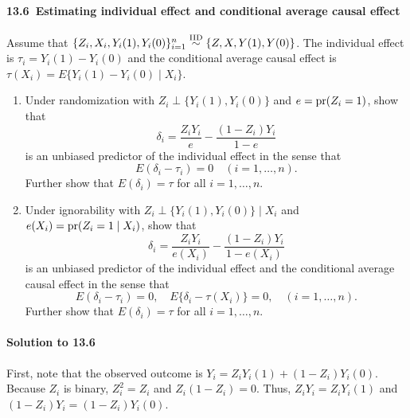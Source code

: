 \documentclass[krantz1]{krantz}
\def\iidsim{\stackrel{\textup{IID}}{\sim}}
\def\pr{\textup{pr}}
\def\ind{\perp}
\def\Paragraph{\paragraph}
\begin{document}
 \Paragraph{13.6~Estimating individual effect and conditional average causal effect}\label{hw::individual-effect-prediction}

Assume that $\{Z_i, X_i, Y_i(1), Y_i(0)\}_{i=1}^n \iidsim \{Z, X, Y(1), Y(0)\}$. The individual effect is $\tau_i = Y_i(1) - Y_i(0)$ and the conditional average causal effect is $\tau(X_i) = E\{Y_i(1) - Y_i(0) \mid X_i\}$.

\begin{enumerate}
\item
Under randomization with $Z_i\ind \{Y_i(1), Y_i(0)\}$ and $e = \pr(Z_i = 1)$, show that
$$
\delta_i = \frac{Z_i Y_i}{e} - \frac{(1-Z_i)Y_i}{1-e}
$$
is an unbiased predictor of the individual effect in the sense that
$$
E(\delta_i - \tau_i) = 0\quad (i=1,\ldots, n).
$$
Further show that $E(\delta_i) = \tau$ for all $i=1,\ldots, n$.

\item
Under ignorability with $Z_i\ind \{Y_i(1), Y_i(0)\}\mid X_i$ and $e(X_i) = \pr(Z_i=1\mid X_i)$, show that
$$
\delta_i = \frac{Z_i Y_i}{e(X_i)} - \frac{(1-Z_i)Y_i}{1-e(X_i)}
$$
is an unbiased predictor of the individual effect and the conditional average causal effect in the sense that
$$
E(\delta_i - \tau_i) = 0, \quad
E\{\delta_i - \tau(X_i)\} = 0, \quad (i=1,\ldots, n).
$$
Further show that $E(\delta_i) = \tau$ for all $i=1,\ldots, n$.
\end{enumerate}

\Paragraph{Solution to 13.6}

First, note that the observed outcome is $Y_i = Z_i Y_i(1) + (1-Z_i) Y_i(0)$. Because $Z_i$ is binary, $Z_i^2 = Z_i$ and $Z_i(1-Z_i) = 0$. Thus, $Z_i Y_i = Z_i Y_i(1)$ and $(1-Z_i) Y_i = (1-Z_i) Y_i(0)$.
\end{document}

